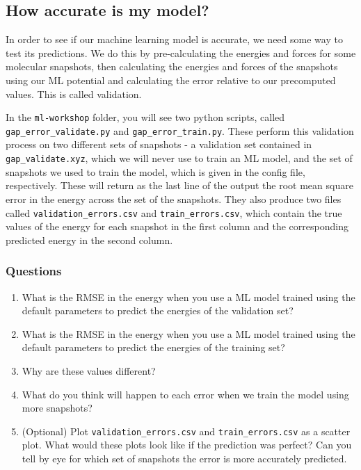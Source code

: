 \documentclass{article}
\begin{document}
\subsection{How accurate is my model?}

In order to see if our machine learning model is accurate, we need some way to test its predictions. We do this by pre-calculating the energies and forces for some molecular snapshots, then calculating the energies and forces of the snapshots using our ML potential and calculating the error relative to our precomputed values. This is called validation.

In the \verb|ml-workshop| folder, you will see two python scripts, called \verb|gap_error_validate.py| and \verb|gap_error_train.py|. These perform this validation process on two different sets of snapshots - a validation set contained in \verb|gap_validate.xyz|, which we will never use to train an ML model, and the set of snapshots we used to train the model, which is given in the config file, respectively. These will return as the last line of the output the root mean square error in the energy across the set of the snapshots. They also produce two files called \verb|validation_errors.csv| and \verb|train_errors.csv|, which contain the true values of the energy for each snapshot in the first column and the corresponding predicted energy in the second column.

\subsubsection*{Questions}

\begin{enumerate}
 
\item What is the RMSE in the energy when you use a ML model trained using the default parameters to predict the energies of the validation set?
\item What is the RMSE in the energy when you use a ML model trained using the default parameters to predict the energies of the training set?
\item Why are these values different?
\item What do you think will happen to each error when we train the model using more snapshots?
\item (Optional) Plot \verb|validation_errors.csv| and \verb|train_errors.csv| as a scatter plot. What would these plots look like if the prediction was perfect? Can you tell by eye for which set of snapshots the error is more accurately predicted.

\end{enumerate}
\end{document}
